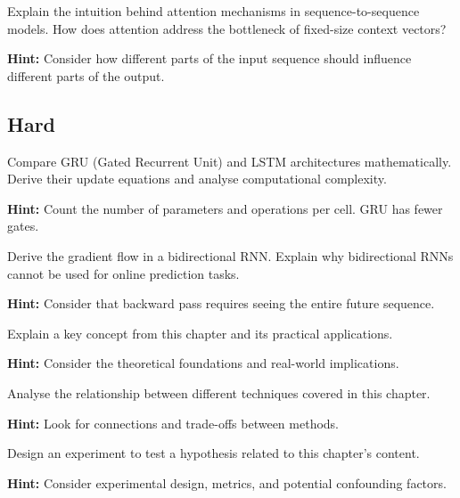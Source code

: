 \begin{problem}
Explain the intuition behind attention mechanisms in sequence-to-sequence models. How does attention address the bottleneck of fixed-size context vectors?

\textbf{Hint:} Consider how different parts of the input sequence should influence different parts of the output.
\end{problem}

\subsection*{Hard}

\begin{problem}
Compare GRU (Gated Recurrent Unit) and LSTM architectures mathematically. Derive their update equations and analyse computational complexity.

\textbf{Hint:} Count the number of parameters and operations per cell. GRU has fewer gates.
\end{problem}

\begin{problem}
Derive the gradient flow in a bidirectional RNN. Explain why bidirectional RNNs cannot be used for online prediction tasks.

\textbf{Hint:} Consider that backward pass requires seeing the entire future sequence.
\end{problem}


\begin{problem}
Explain a key concept from this chapter and its practical applications.

\textbf{Hint:} Consider the theoretical foundations and real-world implications.
\end{problem}

\begin{problem}
Analyse the relationship between different techniques covered in this chapter.

\textbf{Hint:} Look for connections and trade-offs between methods.
\end{problem}

\begin{problem}
Design an experiment to test a hypothesis related to this chapter's content.

\textbf{Hint:} Consider experimental design, metrics, and potential confounding factors.
\end{problem}


